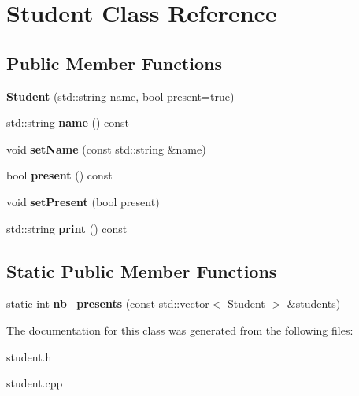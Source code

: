 \hypertarget{classStudent}{\section{Student Class Reference}
\label{classStudent}
}
\subsection*{Public Member Functions}
\begin{DoxyCompactItemize}
\item 
\hypertarget{classStudent_a063214f364986716803e548a2e0d55ac}{{\bfseries Student} (std\-::string name, bool present=true)}\label{classStudent_a063214f364986716803e548a2e0d55ac}

\item 
\hypertarget{classStudent_a69538e2382988910426a9e5986e9c1c0}{std\-::string {\bfseries name} () const }\label{classStudent_a69538e2382988910426a9e5986e9c1c0}

\item 
\hypertarget{classStudent_a489c963162c2b5798154a3217815cfc8}{void {\bfseries set\-Name} (const std\-::string \&name)}\label{classStudent_a489c963162c2b5798154a3217815cfc8}

\item 
\hypertarget{classStudent_a325f15db183c34aa93fd2778a5bfae2d}{bool {\bfseries present} () const }\label{classStudent_a325f15db183c34aa93fd2778a5bfae2d}

\item 
\hypertarget{classStudent_ad2a52a2eb0a337e52bb975e702d33fd1}{void {\bfseries set\-Present} (bool present)}\label{classStudent_ad2a52a2eb0a337e52bb975e702d33fd1}

\item 
\hypertarget{classStudent_a115d672a7573aa94b6b9ed4337e2bbdf}{std\-::string {\bfseries print} () const }\label{classStudent_a115d672a7573aa94b6b9ed4337e2bbdf}

\end{DoxyCompactItemize}
\subsection*{Static Public Member Functions}
\begin{DoxyCompactItemize}
\item 
\hypertarget{classStudent_a7f8802152abaf28410ae2c8b54177f12}{static int {\bfseries nb\-\_\-presents} (const std\-::vector$<$ \hyperlink{classStudent}{Student} $>$ \&students)}\label{classStudent_a7f8802152abaf28410ae2c8b54177f12}

\end{DoxyCompactItemize}


The documentation for this class was generated from the following files\-:\begin{DoxyCompactItemize}
\item 
student.\-h\item 
student.\-cpp\end{DoxyCompactItemize}
